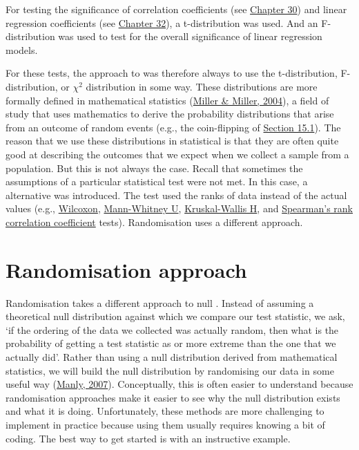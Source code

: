 \documentclass[
  openany]{krantz}
\begin{document}
For testing the significance of correlation coefficients (see \protect\hyperlink{Chapter_30}{Chapter 30}) and linear regression coefficients (see \protect\hyperlink{Chapter_32}{Chapter 32}), a t-distribution was used.
And an F-distribution was used to test for the overall significance of linear regression models.

For these tests, the approach to  was therefore always to use the t-distribution, F-distribution, or \(\chi^{2}\) distribution in some way.
These distributions are more formally defined in mathematical statistics (\protect\hyperlink{ref-Miller2004}{Miller \& Miller, 2004}), a field of study that uses mathematics to derive the probability distributions that arise from an outcome of random events (e.g., the coin-flipping of \protect\hyperlink{an-instructive-example}{Section 15.1}).
The reason that we use these distributions in statistical  is that they are often quite good at describing the outcomes that we expect when we collect a sample from a population.
But this is not always the case.
Recall that sometimes the assumptions of a particular statistical test were not met.
In this case, a  alternative was introduced.
The  test used the ranks of data instead of the actual values (e.g., \protect\hyperlink{wilcoxon-test}{Wilcoxon}, \protect\hyperlink{mann-whitney-u-test}{Mann-Whitney U}, \protect\hyperlink{Chapter_26}{Kruskal-Wallis H}, and \protect\hyperlink{spearman-rank-correlation-coefficient}{Spearman's rank correlation coefficient} tests).
Randomisation uses a different approach.

\hypertarget{randomisation-approach}{%
\section{Randomisation approach}\label{randomisation-approach}}

Randomisation takes a different approach to null .
Instead of assuming a theoretical null distribution against which we compare our test statistic, we ask, `if the ordering of the data we collected was actually random, then what is the probability of getting a test statistic as or more extreme than the one that we actually did'.
Rather than using a null distribution derived from mathematical statistics, we will build the null distribution by randomising our data in some useful way (\protect\hyperlink{ref-Manly2007}{Manly, 2007}).
Conceptually, this is often easier to understand because randomisation approaches make it easier to see why the null distribution exists and what it is doing.
Unfortunately, these methods are more challenging to implement in practice because using them usually requires knowing a bit of coding.
The best way to get started is with an instructive example.
\end{document}
